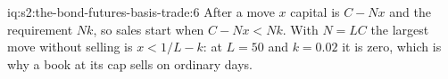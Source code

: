 \begin{solution}{iq:s2:the-bond-futures-basis-trade:6}
After a move $x$ capital is $C - Nx$ and the requirement $Nk$, so sales start when $C - Nx < Nk$. With $N = LC$ the largest move without selling is
$x < 1/L - k$: at $L = 50$ and $k = 0.02$ it is zero, which is why a book at its cap sells on ordinary days.
\end{solution}
